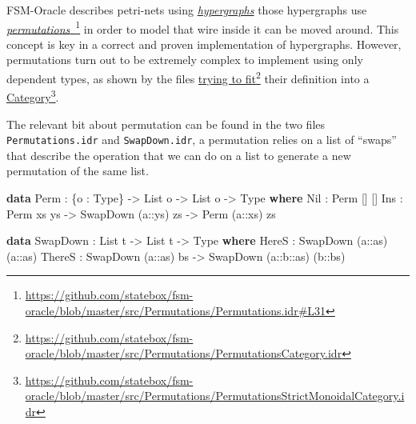 \documentclass[
]{article}
\newenvironment{Shaded}{}{}
\newcommand{\DataTypeTok}[1]{\textcolor[rgb]{0.56,0.13,0.00}{#1}}
\newcommand{\KeywordTok}[1]{\textcolor[rgb]{0.00,0.44,0.13}{\textbf{#1}}}
\newcommand{\NormalTok}[1]{#1}
\newcommand{\OperatorTok}[1]{\textcolor[rgb]{0.40,0.40,0.40}{#1}}
\newcommand{\OtherTok}[1]{\textcolor[rgb]{0.00,0.44,0.13}{#1}}
\begin{document}
FSM-Oracle describes petri-nets using
\href{http://www.zanasi.com/fabio/files/paperCALCO19b.pdf}{\emph{hypergraphs}}
\cite{cartographer} those hypergraphs use
\href{https://github.com/statebox/fsm-oracle/blob/master/src/Permutations/Permutations.idr\#L31}{\emph{permutations}~}\footnote{\url{https://github.com/statebox/fsm-oracle/blob/master/src/Permutations/Permutations.idr\#L31}}
in order to model that wire inside it can be moved around. This concept
is key in a correct and proven implementation of hypergraphs. However,
permutations turn out to be extremely complex to implement using only
dependent types, as shown by the files
\href{https://github.com/statebox/fsm-oracle/blob/master/src/Permutations/PermutationsCategory.idr}{trying
to fit}\footnote{\url{https://github.com/statebox/fsm-oracle/blob/master/src/Permutations/PermutationsCategory.idr}}
their definition into a
\href{https://github.com/statebox/fsm-oracle/blob/master/src/Permutations/PermutationsStrictMonoidalCategory.idr}{Category}\footnote{\url{https://github.com/statebox/fsm-oracle/blob/master/src/Permutations/PermutationsStrictMonoidalCategory.idr}}.

The relevant bit about permutation can be found in the two files
\texttt{Permutations.idr} and \texttt{SwapDown.idr}, a permutation
relies on a list of ``swaps'' that describe the operation that we can do
on a list to generate a new permutation of the same list.

\begin{Shaded}
\begin{Highlighting}[]
\KeywordTok{data} \DataTypeTok{Perm} \OperatorTok{:}\NormalTok{ \{o }\OperatorTok{:} \DataTypeTok{Type}\NormalTok{\} }\OtherTok{{-}\textgreater{}} \DataTypeTok{List}\NormalTok{ o }\OtherTok{{-}\textgreater{}} \DataTypeTok{List}\NormalTok{ o }\OtherTok{{-}\textgreater{}} \DataTypeTok{Type} \KeywordTok{where}
  \DataTypeTok{Nil} \OperatorTok{:} \DataTypeTok{Perm}\NormalTok{ [] []}
  \DataTypeTok{Ins} \OperatorTok{:} \DataTypeTok{Perm}\NormalTok{ xs ys }\OtherTok{{-}\textgreater{}} \DataTypeTok{SwapDown}\NormalTok{ (}\OtherTok{a::}\NormalTok{ys) zs }\OtherTok{{-}\textgreater{}} \DataTypeTok{Perm}\NormalTok{ (}\OtherTok{a::}\NormalTok{xs) zs}

\KeywordTok{data} \DataTypeTok{SwapDown} \OperatorTok{:} \DataTypeTok{List}\NormalTok{ t }\OtherTok{{-}\textgreater{}} \DataTypeTok{List}\NormalTok{ t }\OtherTok{{-}\textgreater{}} \DataTypeTok{Type} \KeywordTok{where}
  \DataTypeTok{HereS}  \OperatorTok{:} \DataTypeTok{SwapDown}\NormalTok{ (}\OtherTok{a::}\NormalTok{as) (}\OtherTok{a::}\NormalTok{as)}
  \DataTypeTok{ThereS} \OperatorTok{:} \DataTypeTok{SwapDown}\NormalTok{ (}\OtherTok{a::}\NormalTok{as) bs }\OtherTok{{-}\textgreater{}} \DataTypeTok{SwapDown}\NormalTok{ (}\OtherTok{a::b::}\NormalTok{as) (}\OtherTok{b::}\NormalTok{bs)}
\end{Highlighting}
\end{Shaded}
\end{document}
